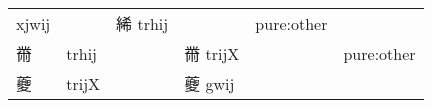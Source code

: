 \documentclass[14pt,a4paper]{scrartcl}
\begin{document}
\begin{longtable}[c]{@{}llllll@{}}
\begin{minipage}[t]{0.14\columnwidth}
xjwij
\strut\end{minipage} &
\begin{minipage}[t]{0.14\columnwidth}\raggedright\strut
\strut\end{minipage} &
\begin{minipage}[t]{0.14\columnwidth}\raggedright\strut
絺 trhij
\strut\end{minipage} &
\begin{minipage}[t]{0.14\columnwidth}\raggedright\strut
\strut\end{minipage} &
\begin{minipage}[t]{0.14\columnwidth}\raggedright\strut
pure:other
\strut\end{minipage}\tabularnewline
\begin{minipage}[t]{0.14\columnwidth}\raggedright\strut
黹
\strut\end{minipage} &
\begin{minipage}[t]{0.14\columnwidth}\raggedright\strut
trhij
\strut\end{minipage} &
\begin{minipage}[t]{0.14\columnwidth}\raggedright\strut
\strut\end{minipage} &
\begin{minipage}[t]{0.14\columnwidth}\raggedright\strut
黹 trijX
\strut\end{minipage} &
\begin{minipage}[t]{0.14\columnwidth}\raggedright\strut
\strut\end{minipage} &
\begin{minipage}[t]{0.14\columnwidth}\raggedright\strut
pure:other
\strut\end{minipage}\tabularnewline
\begin{minipage}[t]{0.14\columnwidth}\raggedright\strut
夔
\strut\end{minipage} &
\begin{minipage}[t]{0.14\columnwidth}\raggedright\strut
trijX
\strut\end{minipage} &
\begin{minipage}[t]{0.14\columnwidth}\raggedright\strut
\strut\end{minipage} &
\begin{minipage}[t]{0.14\columnwidth}\raggedright\strut
夔 gwij
\strut\end{minipage} &
\begin{minipage}[t]{0.14\columnwidth}\raggedright\strut
\strut\end{minipage} &
\begin{minipage}[t]{0.14\columnwidth}\raggedright\strut

\end{minipage}
\end{longtable}
\end{document}
